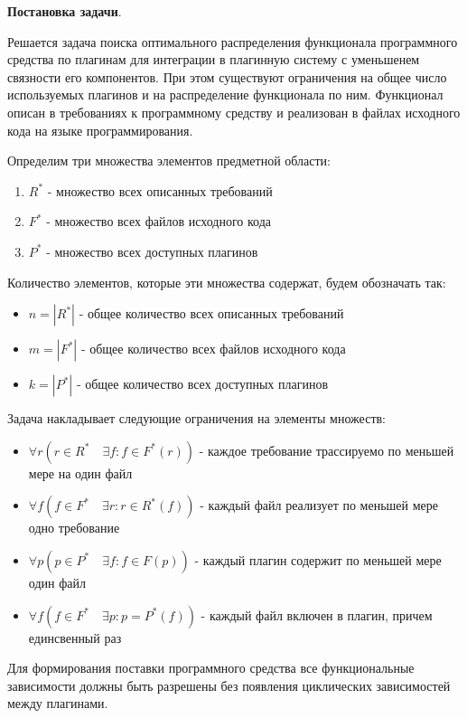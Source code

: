 \documentclass{article}
\begin{document}
  \textbf{Постановка задачи}.

  Решается задача поиска оптимального распределения функционала программного средства по плагинам для интеграции в плагинную систему с уменьшенем связности его компонентов. При этом существуют ограничения на общее число используемых плагинов и на распределение функционала по ним. Функционал описан в требованиях к программному средству и реализован в файлах исходного кода на языке программирования.

  Определим три множества элементов предметной области:
  \begin{enumerate}
    \item $R^*$ - множество всех описанных требований
    \item $F^*$ - множество всех файлов исходного кода
    \item $P^*$ - множество всех доступных плагинов
  \end{enumerate}

  Количество элементов, которые эти множества содержат, будем обозначать так:
  \begin{itemize}
    \item $n = |R^*|$ - общее количество всех описанных требований
    \item $m = |F^*|$ - общее количество всех файлов исходного кода
    \item $k = |P^*|$ - общее количество всех доступных плагинов
  \end{itemize}

  Задача накладывает следующие ограничения на элементы множеств:
  \begin{itemize}
    \item $\forall r (r \in R^* \quad \exists f : f \in F^*(r))$ - каждое требование трассируемо по меньшей мере на один файл
    \item $\forall f (f \in F^* \quad \exists r : r \in R^*(f))$ - каждый файл реализует по меньшей мере одно требование
    \item $\forall p (p \in P^* \quad \exists f : f \in F(p))$ - каждый плагин содержит по меньшей мере один файл
    \item $\forall f (f \in F^* \quad \exists p : p = P^*(f))$ - каждый файл включен в плагин, причем единсвенный раз
  \end{itemize}

  Для формирования поставки программного средства все функциональные зависимости должны быть разрешены без появления циклических зависимостей между плагинами.
\end{document}
